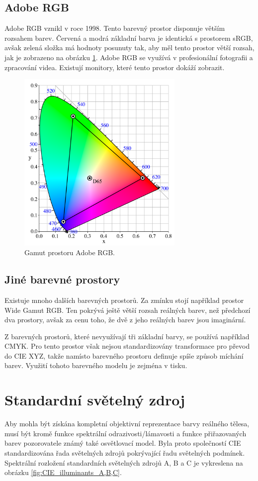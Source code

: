 \documentclass[a4paper, 12pt, titlepage]{article}
\begin{document}
  \subsection{Adobe RGB}
  Adobe RGB vznikl v roce 1998.
  Tento barevný prostor disponuje větším rozsahem barev.
  Červená a modrá základní barva je identická s prostorem sRGB, avšak zelená složka má hodnoty posunuty tak, aby měl tento prostor větší rozsah, jak je zobrazeno na obrázku \ref{fig:CIExy1931_AdobeRGB}.
  Adobe RGB se využívá v profesionální fotografii a zpracování videa.
  Existují monitory, které tento prostor dokáží zobrazit.

  \begin{figure}[h!]
  \centering
  \includegraphics[width=8cm]{CIExy1931_AdobeRGB.png}
  \caption{Gamut prostoru Adobe RGB.}
  \label{fig:CIExy1931_AdobeRGB}
  \end{figure}

  \subsection{Jiné barevné prostory}
  Existuje mnoho dalších barevných prostorů.
  Za zmínku stojí například prostor Wide Gamut RGB.
  Ten pokrývá ještě větší rozsah reálných barev, než předchozí dva prostory, avšak za cenu toho, že dvě z jeho reálných barev jsou imaginární.

  Z barevných prostorů, které nevyužívají tři základní barvy, se používá například CMYK.
  Pro tento prostor však nejsou standardizovány transformace pro převod do CIE XYZ, takže namísto barevného prostoru definuje spíše způsob míchání barev.
  Využití tohoto barevného modelu je zejména v tisku.

  \section{Standardní světelný zdroj}
  Aby mohla být získána kompletní objektivní reprezentace barvy reálného tělesa, musí být kromě funkce spektrální odrazivosti/lámavosti a funkce přiřazovaných barev pozorovatele známý také osvětlovací model.
  Byla proto společností CIE standardizována řada světelných zdrojů pokrývající řadu světelných podmínek.
  Spektrální rozložení standardních světelných zdrojů A, B a C je vykreslena na obrázku \ref{fig:CIE_illuminants_A,B,C}.
\end{document}
